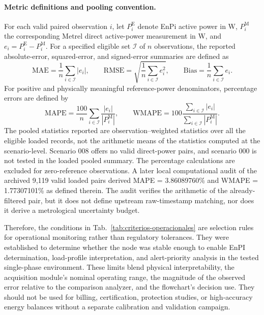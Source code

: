 \documentclass[technologies,article,submit,pdftex,moreauthors]{Definitions/mdpi}
\begin{document}
\paragraph{Metric definitions and pooling convention.}
For each valid paired observation $i$, let $P_i^{\mathrm{E}}$ denote EnPi active power in W, $P_i^{\mathrm{M}}$ the corresponding Metrel direct active-power measurement in W, and $e_i=P_i^{\mathrm{E}}-P_i^{\mathrm{M}}$. For a specified eligible set $\mathcal I$ of $n$ observations, the reported absolute-error, squared-error, and signed-error summaries are defined as
\begin{equation}
\mathrm{MAE}=\frac{1}{n}\sum_{i\in\mathcal I}|e_i|,\qquad
\mathrm{RMSE}=\sqrt{\frac{1}{n}\sum_{i\in\mathcal I}e_i^2},\qquad
\mathrm{Bias}=\frac{1}{n}\sum_{i\in\mathcal I}e_i.
\label{eq:r2_absolute_metrics}
\end{equation}
For positive and physically meaningful reference-power denominators, percentage errors are defined by
\begin{equation}
\mathrm{MAPE}=\frac{100}{n}\sum_{i\in\mathcal I}\frac{|e_i|}{|P_i^{\mathrm{M}}|},\qquad
\mathrm{WMAPE}=100\frac{\sum_{i\in\mathcal I}|e_i|}{\sum_{i\in\mathcal I}|P_i^{\mathrm{M}}|}.
\label{eq:r2_percentage_metrics}
\end{equation}
The pooled statistics reported are observation–weighted statistics over all the eligible loaded records, not the arithmetic means of the statistics computed at the scenario-level. Scenario 008 offers no valid direct-power pairs, and scenario 000 is not tested in the loaded pooled summary. The percentage calculations are excluded for zero-reference observations. A later local computational audit of the archived 9,119 valid loaded pairs derived MAPE = 3.86089760\% and WMAPE = 1.77307101\% as defined therein. The audit verifies the arithmetic of the already-filtered pair, but it does not define upstream raw-timestamp matching, nor does it derive a metrological uncertainty budget.

Therefore, the conditions in Tab.~\ref{tab:criterios-operacionales} are selection rules for operational monitoring rather than regulatory tolerances. They were established to determine whether the node was stable enough to enable EnPI determination, load-profile interpretation, and alert-priority analysis in the tested single-phase environment. These limits blend physical interpretability, the acquisition module's nominal operating range, the magnitude of the observed error relative to the comparison analyzer, and the flowchart's decision use. They should not be used for billing, certification, protection studies, or high-accuracy energy balances without a separate calibration and validation campaign. 
\end{document}
